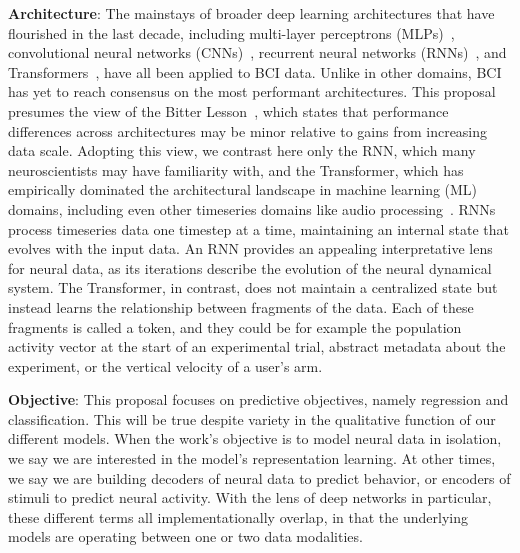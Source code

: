 \documentclass[12pt,oneside]{report}
\begin{document}
\textbf{Architecture}: The mainstays of broader deep learning architectures that have flourished in the last decade, including multi-layer perceptrons (MLPs)~\citep{Willsey2022HighVelocity}, convolutional neural networks (CNNs)~\citep{temmar2024artificial}, recurrent neural networks (RNNs)~\citep{pandarinath_18_lfads}, and Transformers~\citep{ye_21_ndt}, have all been applied to BCI data. Unlike in other domains, BCI has yet to reach consensus on the most performant architectures.
This proposal presumes the view of the Bitter Lesson~\citep{sutton2019}, which states that performance differences across architectures may be minor relative to gains from increasing data scale.
Adopting this view, we contrast here only the RNN, which many neuroscientists may have familiarity with, and the Transformer, which has empirically dominated the architectural landscape in machine learning (ML) domains, including even other timeseries domains like audio processing~\citep{radford2022whisper}. RNNs process timeseries data one timestep at a time, maintaining an internal state that evolves with the input data. An RNN provides an appealing interpretative lens for neural data, as its iterations describe the evolution of the neural dynamical system. The Transformer, in contrast, does not maintain a centralized state but instead learns the relationship between fragments of the data. Each of these fragments is called a token, and they could be for example the population activity vector at the start of an experimental trial, abstract metadata about the experiment, or the vertical velocity of a user’s arm.

\textbf{Objective}: This proposal focuses on predictive objectives, namely regression and classification. This will be true despite variety in the qualitative function of our different models. When the work’s objective is to model neural data in isolation, we say we are interested in the model’s representation learning. At other times, we say we are building decoders of neural data to predict behavior, or encoders of stimuli to predict neural activity. With the lens of deep networks in particular, these different terms all implementationally overlap, in that the underlying models are operating between one or two data modalities.
\end{document}
